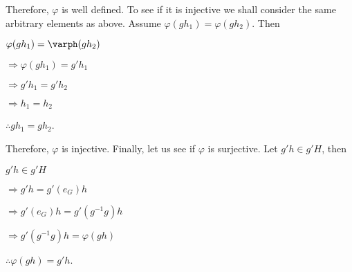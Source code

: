 \documentclass[12pt, a4paper]{article}
\begin{document}
\begin{flushleft}

    Therefore, $\varphi$ is well defined. To see if it is injective we shall consider the same arbitrary elements as above. Assume $\varphi(gh_1)=\varphi(gh_2)$. Then\par
    
\end{flushleft}

\hspace{2mm} $\varphi(gh_1)=\varph(gh_2)$\par
\vspace{2mm}
\hspace{10mm} $\Rightarrow\varphi(gh_1)=g'h_1$\par
\vspace{2mm}
\hspace{10mm} $\Rightarrow g'h_1=g'h_2$\par
\vspace{2mm}
\hspace{10mm} $\Rightarrow h_1=h_2$\par
\vspace{2mm}
\hspace{2mm} $\therefore gh_1=gh_2$.\par

\begin{flushleft}

    Therefore, $\varphi$ is injective. Finally, let us see if $\varphi$ is surjective. Let $g'h\in g'H$, then \par
    
\end{flushleft}

\hspace{2mm} $g'h\in g'H$\par
\vspace{2mm}
\hspace{10mm} $\Rightarrow g'h=g'(e_G)h$\par
\vspace{2mm}
\hspace{10mm} $\Rightarrow g'(e_G)h=g'(g^{-1}g)h$\par
\vspace{2mm}
\hspace{10mm} $\Rightarrow g'(g^{-1}g)h=\varphi(gh)$\par
\vspace{2mm}
\hspace{2mm} $\therefore \varphi(gh)=g'h$.\par
\end{document}
